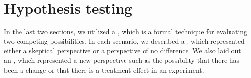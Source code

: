 




%
%
%
%





\section{Hypothesis testing}
\label{HypothesisTesting}

In the last two sections, we utilized a , which is a formal technique for evaluating two competing possibilities. In each scenario, we described a , which represented either a skeptical perspective or a perspective of no difference. We also laid out an , which represented a new perspective such as the possibility that there has been a change or that there is a treatment effect in an experiment.

